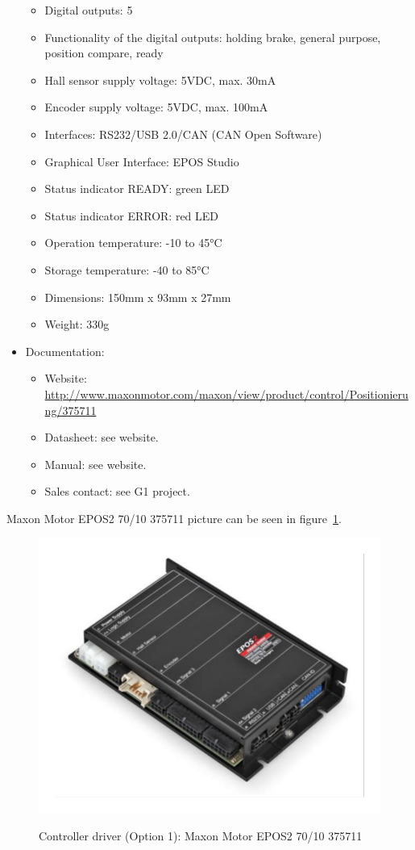 \begin{itemize}
\begin{itemize}
    \item Digital outputs: 5
    \item Functionality of the digital outputs: holding brake, general purpose, position compare, ready
    \item Hall sensor supply voltage: 5VDC, max. 30mA
    \item Encoder supply voltage: 5VDC, max. 100mA
    \item Interfaces: RS232/USB 2.0/CAN (CAN Open Software)
    \item Graphical User Interface: EPOS Studio
    \item Status indicator READY: green LED
    \item Status indicator ERROR: red LED
    \item Operation temperature: -10 to 45°C
    \item Storage temperature: -40 to 85°C
    \item Dimensions: 150mm x 93mm x 27mm
    \item Weight: 330g
  \end{itemize}
  \item Documentation:
  \begin{itemize}
    \item Website: \href{http://www.maxonmotor.com/maxon/view/product/control/Positionierung/375711}{http://www.maxonmotor.com/maxon/view/product/control/Positionierung/375711}
    \item Datasheet: see website.
    \item Manual: see website.
    \item Sales contact: see G1 project.
  \end{itemize}
\end{itemize}
Maxon Motor EPOS2 70/10 375711 picture can be seen in figure~\ref{FIG:DEVICEDRIVEROPTION1}.
\begin{figure}
  \centering
  \includegraphics[angle=90,width=1\columnwidth]{figs/body02/FIGDEVICEDRIVEROPTION1.pdf}\\
  \caption[Controller driver (Option 1): Maxon Motor EPOS2 70/10 375711]{Controller driver (Option 1): Maxon Motor EPOS2 70/10 375711}
  \label{FIG:DEVICEDRIVEROPTION1}
\end{figure}
